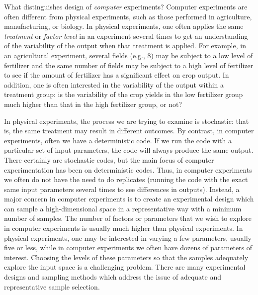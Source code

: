 What distinguishes design of {\em computer} experiments?  Computer
experiments are often different from physical experiments, such as
those performed in agriculture, manufacturing, or biology. In
physical experiments, one often applies the same \emph{treatment} or
\emph{factor level} in an experiment several times to get an
understanding of the variability of the output when that treatment is
applied. For example, in an agricultural experiment, several fields
(e.g., 8) may be subject to a low level of fertilizer and the same
number of fields may be subject to a high level of fertilizer to see
if the amount of fertilizer has a significant effect on crop
output. In addition, one is often interested in the variability of the
output within a treatment group: is the variability of the crop yields
in the low fertilizer group much higher than that in the high
fertilizer group, or not?

In physical experiments, the process we are trying to examine is stochastic:  
that is, the same treatment may result in different outcomes. 
By contrast, in computer experiments, often we have a deterministic code. 
If we run the code with a particular set of input parameters, the code 
will always produce the same output. There certainly are stochastic codes, 
but the main focus of computer experimentation has been on deterministic codes. 
Thus, in computer experiments we often do not have the need to do replicates 
(running the code with the exact same input parameters several times to see 
differences in outputs). Instead, a major concern in computer experiments is 
to create an experimental design which can sample a high-dimensional space 
in a representative way with a minimum number of samples. 
The number of factors or parameters that we wish to explore in computer 
experiments is usually much higher than physical experiments. 
In physical experiments, one may be interested in varying a few parameters, 
usually five or less, while in computer experiments we often have 
dozens of parameters of interest. Choosing the levels of these parameters 
so that the samples adequately explore the input space is a challenging 
problem. There are many experimental designs and sampling methods 
which address the issue of adequate and representative sample selection. 

